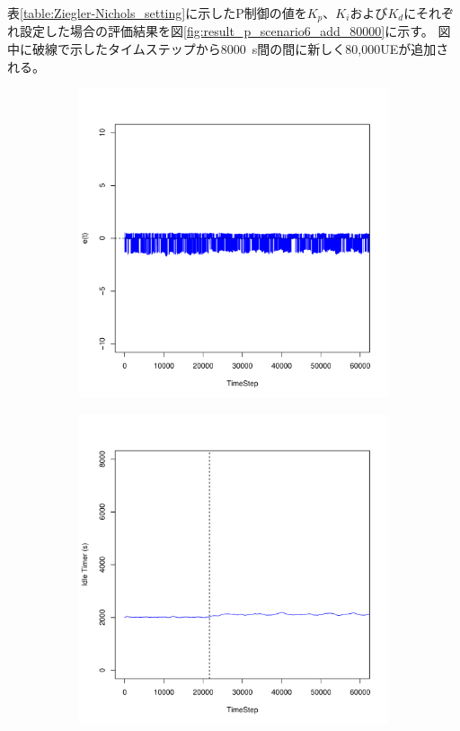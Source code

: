 \documentclass[a4j]{ujarticle}
\begin{document}
\clearpage
表\ref{table:Ziegler-Nichols_setting}に示したP制御の値を$K_p$、$K_i$および$K_d$にそれぞれ設定した場合の評価結果を図\ref{fig:result_p_scenario6_add_80000}に示す。
図中に破線で示したタイムステップから8000~s間の間に新しく80,000UEが追加される。
\begin{figure}[htbp]
 \centering
 \begin{subfigure}{0.49\hsize}
   \centering
   \includegraphics[width=1.0\hsize]{scenario_6_e_345600_691200_1-5_0_0_0_ideal_add_80000.pdf}
   \label{subfig:scenario_6_e_345600_691200_1-5_0_0_0_ideal_add_80000}
 \end{subfigure}
 \begin{subfigure}{0.49\hsize}
   \centering
   \includegraphics[width=1.0\hsize]{scenario_6_idleTimer_345600_691200_1-5_0_0_0_ideal_add_80000.pdf}

\end{subfigure}
\end{figure}
\end{document}
